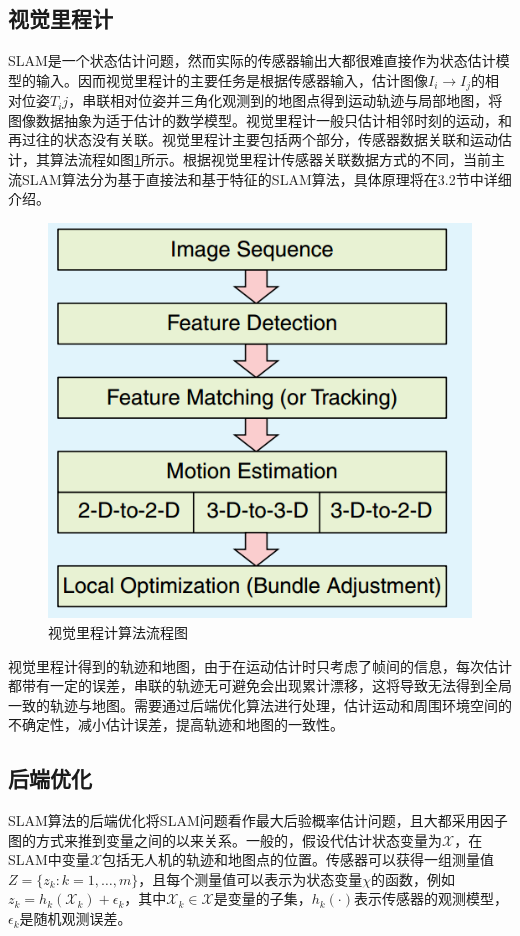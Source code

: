 \subsection{视觉里程计}
SLAM是一个状态估计问题，然而实际的传感器输出大都很难直接作为状态估计模型的输入。因而视觉里程计的主要任务是根据传感器输入，估计图像$I_i \rightarrow I_j$的相对位姿$T_ij$，串联相对位姿并三角化观测到的地图点得到运动轨迹与局部地图，将图像数据抽象为适于估计的数学模型。视觉里程计一般只估计相邻时刻的运动，和再过往的状态没有关联。视觉里程计主要包括两个部分，传感器数据关联和运动估计，其算法流程如图\ref{fig3.2}所示。根据视觉里程计传感器关联数据方式的不同，当前主流SLAM算法分为基于直接法和基于特征的SLAM算法，具体原理将在3.2节中详细介绍。
\begin{figure}[h]
\centering
\includegraphics[scale=0.5]{figures/Fig3.2.png}
\caption{视觉里程计算法流程图}
\label{fig3.2}
\end{figure}

视觉里程计得到的轨迹和地图，由于在运动估计时只考虑了帧间的信息，每次估计都带有一定的误差，串联的轨迹无可避免会出现累计漂移，这将导致无法得到全局一致的轨迹与地图。需要通过后端优化算法进行处理，估计运动和周围环境空间的不确定性，减小估计误差，提高轨迹和地图的一致性。


\subsection{后端优化}
SLAM算法的后端优化将SLAM问题看作最大后验概率估计问题，且大都采用因子图的方式来推到变量之间的以来关系。一般的，假设代估计状态变量为$\mathcal{X}$，在SLAM中变量$\mathcal{X}$包括无人机的轨迹和地图点的位置。传感器可以获得一组测量值$Z=\lbrace z_k:k=1,\ldots ,m\rbrace$，且每个测量值可以表示为状态变量$\chi$的函数，例如$z_k=h_k\left( \mathcal{X}_k \right)+\epsilon_k$，其中$\mathcal{X}_k \in \mathcal{X}$是变量的子集，$h_k(\cdot)$表示传感器的观测模型，$\epsilon_k$是随机观测误差。

